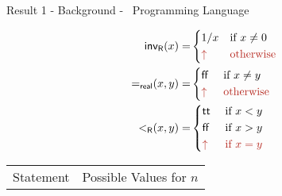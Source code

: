 \begin{frame}{Result 1 - Background - \WhileCC\ Programming Language}
\begin{minipage}[t]{0.34\linewidth}
    \end{minipage}
    \begin{minipage}[t]{0.30\linewidth}
        \pause
        \begin{center}
             \vspace{-1.8em}
             \textbf{\color{Blue}{Semantics} }
         \end{center}            
            \begin{align*}
            \realInv(x) = &
                \begin{cases*}
                    1/x & if $x \neq 0$\\
                    {\color{BrickRed}\uparrow} & {\color{BrickRed}otherwise}
                \end{cases*}\\
            \mathsf{=_{real}}(x,y) = &
                \begin{cases*}
                    \false\ & if $x \neq y$\\
                    {\color{BrickRed} \uparrow\ }& {\color{BrickRed} otherwise}
                \end{cases*}\\
            \realLess(x,y) = &
                \begin{cases*}
                    \true\ & if $x<y$\\
                    \false\ & if $x>y$\\
                    {\color{BrickRed}\uparrow} & {\color{BrickRed} if $x=y$}\\
                \end{cases*}
            \end{align*}
        \setlength{\fboxsep}{0pt}
    \end{minipage}
    \pause
    \begin{minipage}[t]{0.67\linewidth}
        \vspace{-1.3em}
        \begin{table}[]
            \centering
            \begin{tabular}{|c|c|}
                \hline
                Statement & Possible Values for $n$ \\

\end{tabular}
\end{table}
\end{minipage}
\end{frame}
